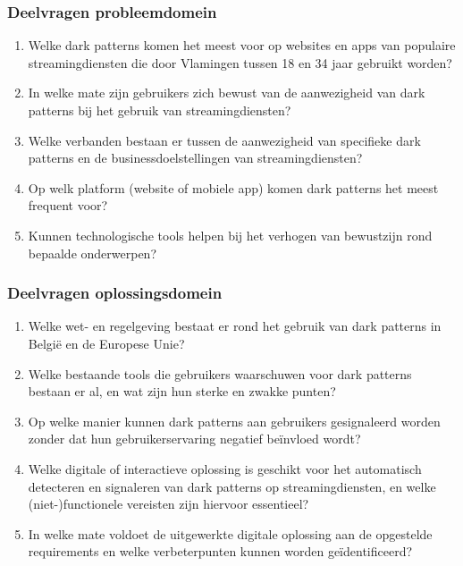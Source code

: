 \subsubsection*{Deelvragen probleemdomein}
\begin{enumerate}
    \item Welke dark patterns komen het meest voor op websites en apps van populaire streamingdiensten die door Vlamingen tussen 18 en 34 jaar gebruikt worden?
    \item In welke mate zijn gebruikers zich bewust van de aanwezigheid van dark patterns bij het gebruik van streamingdiensten?
    \item Welke verbanden bestaan er tussen de aanwezigheid van specifieke dark patterns en de businessdoelstellingen van streamingdiensten?
    \item Op welk platform (website of mobiele app) komen dark patterns het meest frequent voor?
    \item Kunnen technologische tools helpen bij het verhogen van bewustzijn rond bepaalde onderwerpen?
\end{enumerate}

\subsubsection*{Deelvragen oplossingsdomein}
\begin{enumerate}
    \item Welke wet- en regelgeving bestaat er rond het gebruik van dark patterns in België en de Europese Unie? %
    \item Welke bestaande tools die gebruikers waarschuwen voor dark patterns bestaan er al, en wat zijn hun sterke en zwakke punten?
    \item Op welke manier kunnen dark patterns aan gebruikers gesignaleerd worden zonder dat hun gebruikerservaring negatief beïnvloed wordt?
    \item Welke digitale of interactieve oplossing is geschikt voor het automatisch detecteren en signaleren van dark patterns op streamingdiensten, en welke (niet-)functionele vereisten zijn hiervoor essentieel?
    \item In welke mate voldoet de uitgewerkte digitale oplossing aan de opgestelde requirements en welke verbeterpunten kunnen worden geïdentificeerd?
\end{enumerate}

\vspace{1em}

